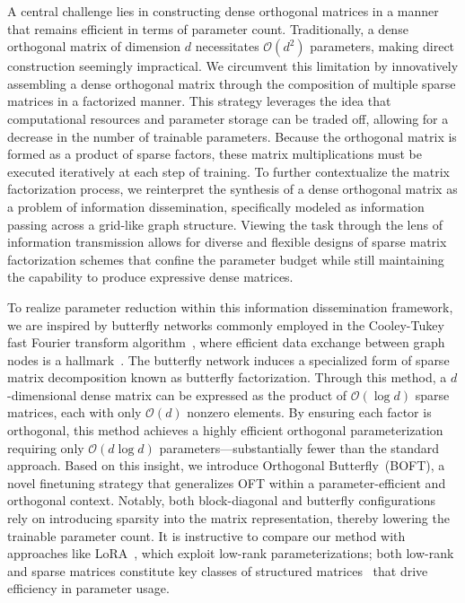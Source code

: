 A central challenge lies in constructing dense orthogonal matrices in a manner that remains efficient in terms of parameter count. Traditionally, a dense orthogonal matrix of dimension $d$ necessitates $\mathcal{O}(d^2)$ parameters, making direct construction seemingly impractical. We circumvent this limitation by innovatively assembling a dense orthogonal matrix through the composition of multiple sparse matrices in a factorized manner. This strategy leverages the idea that computational resources and parameter storage can be traded off, allowing for a decrease in the number of trainable parameters. Because the orthogonal matrix is formed as a product of sparse factors, these matrix multiplications must be executed iteratively at each step of training. To further contextualize the matrix factorization process, we reinterpret the synthesis of a dense orthogonal matrix as a problem of information dissemination, specifically modeled as information passing across a grid-like graph structure. Viewing the task through the lens of information transmission allows for diverse and flexible designs of sparse matrix factorization schemes that confine the parameter budget while still maintaining the capability to produce expressive dense matrices.

To realize parameter reduction within this information dissemination framework, we are inspired by butterfly networks commonly employed in the Cooley-Tukey fast Fourier transform algorithm~\cite{cooley1965algorithm}, where efficient data exchange between graph nodes is a hallmark~\cite{klasing1994broadcasting}. The butterfly network induces a specialized form of sparse matrix decomposition known as butterfly factorization. Through this method, a $d$-dimensional dense matrix can be expressed as the product of $\mathcal{O}(\log d)$ sparse matrices, each with only $\mathcal{O}(d)$ nonzero elements. By ensuring each factor is orthogonal, this method achieves a highly efficient orthogonal parameterization requiring only $\mathcal{O}(d\log d)$ parameters—substantially fewer than the standard approach. Based on this insight, we introduce Orthogonal Butterfly~(BOFT), a novel finetuning strategy that generalizes OFT within a parameter-efficient and orthogonal context. Notably, both block-diagonal and butterfly configurations rely on introducing sparsity into the matrix representation, thereby lowering the trainable parameter count. It is instructive to compare our method with approaches like LoRA~\cite{hulora2022}, which exploit low-rank parameterizations; both low-rank and sparse matrices constitute key classes of structured matrices~\cite{candes2011robust} that drive efficiency in parameter usage.

